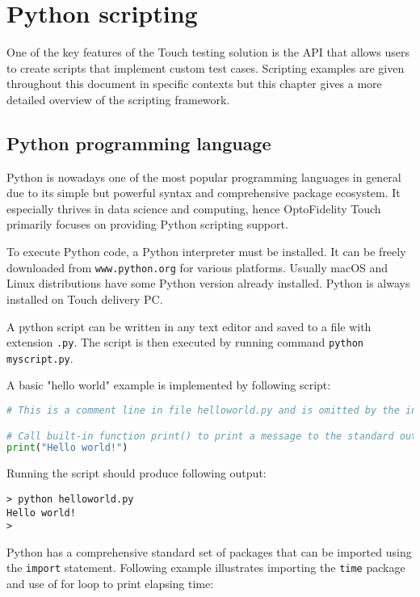 \chapter{Python scripting}

One of the key features of the Touch testing solution is the API that allows users to create scripts that implement custom test cases. Scripting examples are given throughout this document in specific contexts but this chapter gives a more detailed overview of the scripting framework.

\section{Python programming language}

Python is nowadays one of the most popular programming languages in general due to its simple but powerful syntax and comprehensive package ecosystem. It especially thrives in data science and computing, hence OptoFidelity Touch primarily focuses on providing Python scripting support.

To execute Python code, a Python interpreter must be installed. It can be freely downloaded from \texttt{www.python.org} for various platforms. Usually macOS and Linux distributions have some Python version already installed. Python is always installed on Touch delivery PC.

A python script can be written in any text editor and saved to a file with extension \texttt{.py}. The script is then executed by running command \texttt{python myscript.py}.

A basic "hello world" example is implemented by following script:

\begin{lstlisting}[language=Python]
# This is a comment line in file helloworld.py and is omitted by the interpreter.

# Call built-in function print() to print a message to the standard output.
print("Hello world!")
\end{lstlisting}

Running the script should produce following output:

\begin{lstlisting}
> python helloworld.py
Hello world!
>
\end{lstlisting}

Python has a comprehensive standard set of packages that can be imported using the \texttt{import} statement. Following example illustrates importing the \texttt{time} package and use of for loop to print elapsing time:

